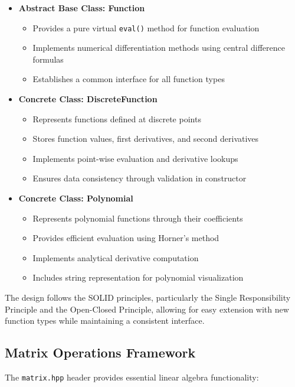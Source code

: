 \documentclass{article}
\begin{document}
\begin{itemize}
    \item \textbf{Abstract Base Class: Function}
    \begin{itemize}
        \item Provides a pure virtual \texttt{eval()} method for function evaluation
        \item Implements numerical differentiation methods using central difference formulas
        \item Establishes a common interface for all function types
    \end{itemize}
    
    \item \textbf{Concrete Class: DiscreteFunction}
    \begin{itemize}
        \item Represents functions defined at discrete points
        \item Stores function values, first derivatives, and second derivatives
        \item Implements point-wise evaluation and derivative lookups
        \item Ensures data consistency through validation in constructor
    \end{itemize}
    
    \item \textbf{Concrete Class: Polynomial}
    \begin{itemize}
        \item Represents polynomial functions through their coefficients
        \item Provides efficient evaluation using Horner's method
        \item Implements analytical derivative computation
        \item Includes string representation for polynomial visualization
    \end{itemize}
\end{itemize}

The design follows the SOLID principles, particularly the Single Responsibility Principle and the Open-Closed Principle, allowing for easy extension with new function types while maintaining a consistent interface.

\subsection{Matrix Operations Framework}
The \texttt{matrix.hpp} header provides essential linear algebra functionality:
\end{document}

